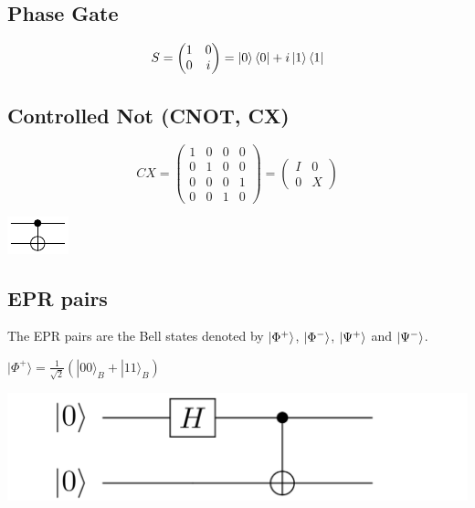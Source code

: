 \documentclass[a4paper,10pt]{scrartcl}
\begin{document}
\subsection*{Phase Gate}
\[S = 
\begin{pmatrix}
1 & 0\\ 
0 & i
\end{pmatrix}
= \ket{0}\bra{0} + i\ket{\text{1}}\bra{1}
\]



\subsection*{Controlled Not (CNOT, CX)}


\begin{minipage}{\linewidth}
\begin{minipage}{0.5\linewidth}\center
\[CX = 
\begin{pmatrix}
1 & 0 & 0 & 0\\ 
0 & 1 & 0 & 0 \\
0 & 0 & 0 & 1 \\
0 & 0 & 1 & 0
\end{pmatrix}
= 
\begin{pmatrix}
I & 0\\ 
0 & X

\end{pmatrix}
\]
\end{minipage}
\begin{minipage}{0.5\linewidth}\center
\vspace*{\fill}
\includegraphics[scale=2]{img/CNOT_gate.pdf}
\vspace*{\fill}
\end{minipage}
\end{minipage}


\subsection*{EPR pairs}
The EPR pairs are the Bell states denoted by $\ket{\Phi ^+}$, $\ket{\Phi ^-}$, $\ket{\Psi ^+}$ and $\ket{\Psi ^-}$.
\vspace{2\baselineskip}

\begin{minipage}{\linewidth}
\begin{minipage}{0.5\linewidth}\center
$|\Phi^+\rangle = \frac{1}{\sqrt{2}} (|00\rangle_B + |11\rangle_B)$
\end{minipage}
\begin{minipage}{0.5\linewidth}\center
\vspace*{\fill}
\includegraphics[scale=0.1]{img/h_cnot.png}
\vspace*{\fill}
\end{minipage}
\end{minipage}
\end{document}
